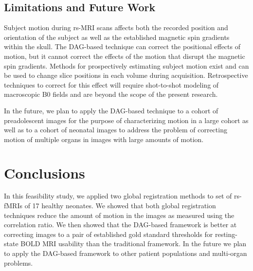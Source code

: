 \subsection{Limitations and Future Work}

Subject motion during rs-MRI scans affects both the recorded position and orientation of the subject as well as the established magnetic spin gradients within the skull. The DAG-based technique can correct the positional effects of motion, but it cannot correct the effects of the motion that disrupt the magnetic spin gradients. Methods for prospectively estimating subject motion exist and can be used to change slice positions in each volume during acquisition. Retrospective techniques to correct for this effect will require shot-to-shot modeling of macroscopic B0 fields and are beyond the scope of the present research.

In the future, we plan to apply the DAG-based technique to a cohort of preadolescent images for the purpose of characterizing motion in a large cohort as well as to a cohort of neonatal images to address the problem of correcting motion of multiple organs in images with large amounts of motion.  

\section{Conclusions}

In this feasibility study, we applied two global registration methods to set of rs-fMRIs of 17 healthy neonates. We showed that both global registration techniques reduce the amount of motion in the images as measured using the correlation ratio. We then showed that the DAG-based framework is better at correcting images to a pair of established gold standard thresholds for resting-state BOLD MRI usability than the traditional framework. In the future we plan to apply the DAG-based framework to other patient populations and multi-organ problems.